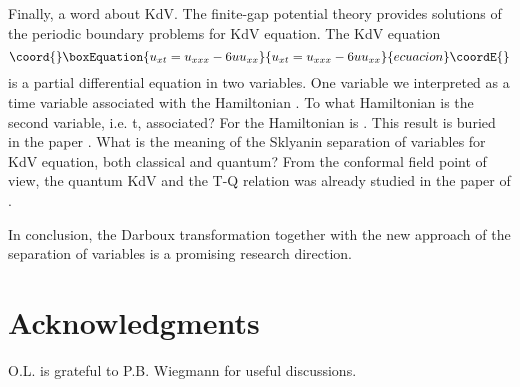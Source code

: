 \documentclass[a4paper,11pt]{article}
\begin{document}
Finally, a word about KdV. The finite-gap potential
theory provides solutions of the periodic boundary problems for KdV
equation. The KdV equation
\begin{equation}\coord{}\boxEquation{
u_{xt}=u_{xxx}-6uu_{xx}
}{
u_{xt}=u_{xxx}-6uu_{xx}
}{ecuacion}\coordE{}\end{equation}
is a partial differential equation in two variables. One variable \coordHE{} we
interpreted as a time variable associated with the Hamiltonian \coordHE{}. To
what Hamiltonian is the second variable, i.e. t, associated? For \coordHE{}
the Hamiltonian is \coordHE{}. This result is buried in the paper
\cite{Weiss}. What is the meaning of the Sklyanin separation of variables
for KdV equation, both classical and quantum? From the conformal field point
of view, the quantum KdV and the T-Q relation was already studied in the
paper of \cite{Zam}.

In conclusion, the Darboux transformation together with the new approach of
the separation of variables is a promising research direction.

\section*{Acknowledgments}
\noindent
O.L. is grateful to P.B. Wiegmann for useful discussions.
\end{document}
